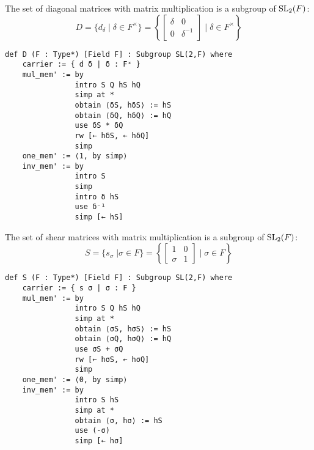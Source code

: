\begin{definition}
\label{SpecialSubgroups.D}
\leanok
    The set of diagonal matrices with matrix multiplication is a subgroup of $\operatorname{SL}_2(F)$: 
    \[
    D = \{d_\delta \; | \; \delta \in F^\times \} = \left\{ \begin{bmatrix}\delta & 0\\ 0 & \delta^{-1}\end{bmatrix} \; | \; \delta \in F^\times \right\}
    \]
\end{definition}
\begin{footnotesize}
\begin{verbatim}
def D (F : Type*) [Field F] : Subgroup SL(2,F) where
    carrier := { d δ | δ : Fˣ }
    mul_mem' := by
                intro S Q hS hQ
                simp at *
                obtain ⟨δS, hδS⟩ := hS
                obtain ⟨δQ, hδQ⟩ := hQ
                use δS * δQ
                rw [← hδS, ← hδQ]
                simp
    one_mem' := ⟨1, by simp⟩
    inv_mem' := by
                intro S
                simp
                intro δ hS
                use δ⁻¹
                simp [← hS]
\end{verbatim}
\end{footnotesize}

\begin{definition}
\label{SpecialSubgroups.S}
\leanok
    The set of shear matrices with matrix multiplication is a subgroup of $\operatorname{SL}_2(F)$:
    \[
    S = \{s_\sigma \; | \sigma \in F\} = \left\{\begin{bmatrix}1 & 0\\ \sigma & 1\end{bmatrix} \; | \; \sigma \in F \right\}
    \]
\end{definition}
\begin{footnotesize}
\begin{verbatim}
def S (F : Type*) [Field F] : Subgroup SL(2,F) where
    carrier := { s σ | σ : F }
    mul_mem' := by
                intro S Q hS hQ
                simp at *
                obtain ⟨σS, hσS⟩ := hS
                obtain ⟨σQ, hσQ⟩ := hQ
                use σS + σQ
                rw [← hσS, ← hσQ]
                simp
    one_mem' := ⟨0, by simp⟩
    inv_mem' := by
                intro S hS
                simp at *
                obtain ⟨σ, hσ⟩ := hS
                use (-σ)
                simp [← hσ]
\end{verbatim}
\end{footnotesize}

